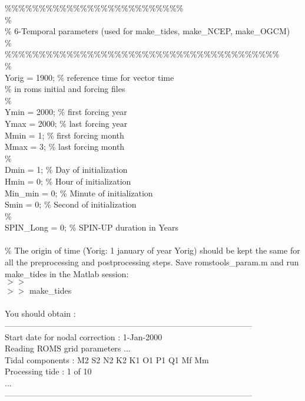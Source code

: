\%\%\%\%\%\%\%\%\%\%\%\%\%\%\%\%\%\%\%\%\%\%\%\%\%\%\\
\%\\
\% 6-Temporal parameters (used for make\_tides, make\_NCEP, make\_OGCM)\\
\%\\
\%\%\%\%\%\%\%\%\%\%\%\%\%\%\%\%\%\%\%\%\%\%\%\%\%\%\%\%\%\%\%\%\%\%\%\%\%\%\%\%\\
\%\\
Yorig         = 1900;               \% reference time for vector time\\
                                    \% in roms initial and forcing files\\
\%\\
Ymin          = 2000;               \% first forcing year\\
Ymax          = 2000;               \% last  forcing year\\
Mmin          = 1;                  \% first forcing month\\
Mmax          = 3;                  \% last  forcing month\\
\%\\
Dmin          = 1;                  \% Day of initialization\\
Hmin          = 0;                  \% Hour of initialization\\
Min\_min       = 0;                  \% Minute of initialization\\
Smin          = 0;                  \% Second of initialization\\
\%\\
SPIN\_Long     = 0;                  \% SPIN-UP duration in Years\\
\\
\%
The origin of time (Yorig: 1 january of year Yorig) should be kept the same
for all the preprocessing and postprocessing steps.
Save romstools\_param.m and run make\_tides in the Matlab session:
\\
$>>$\\
$>>$ make\_tides\\\\
You should obtain :\\
------------------------------------------------------------------------------------------\\
Start date for nodal correction : 1-Jan-2000\\
Reading ROMS grid parameters ...\\
Tidal components : M2 S2 N2 K2 K1 O1 P1 Q1 Mf Mm \\
Processing tide : 1 of 10\\
...\\
------------------------------------------------------------------------------------------\\
